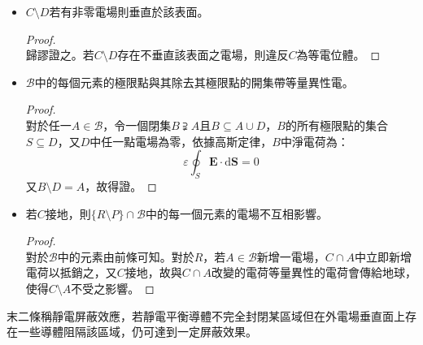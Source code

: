\documentclass[a4paper,12pt]{report}
\begin{document}
\begin{itemize}
\begin{itemize}
\begin{proof}
\[\varepsilon_0\iint_{S}\mathbf {E} \cdot \mathrm{d}\mathbf{S}=q\]
違反$D$中任意點電場為零。
\end{proof}
\item $C\setminus D$若有非零電場則垂直於該表面。
\begin{proof}\mbox{}\\
歸謬證之。若$C\setminus D$存在不垂直該表面之電場，則違反$C$為等電位體。
\end{proof}
\item $\mathscr{B}$中的每個元素的極限點與其除去其極限點的開集帶等量異性電。
\begin{proof}\mbox{}\\
對於任一$A\in\mathscr{B}$，令一個閉集$B\supsetneqq A$且$B\subseteq A\cup D$，$B$的所有極限點的集合$S\subseteq D$，又$D$中任一點電場為零，依據高斯定律，$B$中淨電荷為：
\[\varepsilon\oint_S\mathbf{E}\cdot\mathrm{d}\mathbf{S}=0\]
又$B\setminus D=A$，故得證。
\end{proof}
\item 若$C$接地，則$\{R\setminus P\}\cap\mathscr{B}$中的每一個元素的電場不互相影響。
\begin{proof}\mbox{}\\
對於$\mathscr{B}$中的元素由前條可知。對於$R$，若$A\in\mathscr{B}$新增一電場，$C\cap A$中立即新增電荷以抵銷之，又$C$接地，故與$C\cap A$改變的電荷等量異性的電荷會傳給地球，使得$C\setminus A$不受之影響。
\end{proof}
\end{itemize}
末二條稱靜電屏蔽效應，若靜電平衡導體不完全封閉某區域但在外電場垂直面上存在一些導體阻隔該區域，仍可達到一定屏蔽效果。

\end{itemize}
\end{document}
